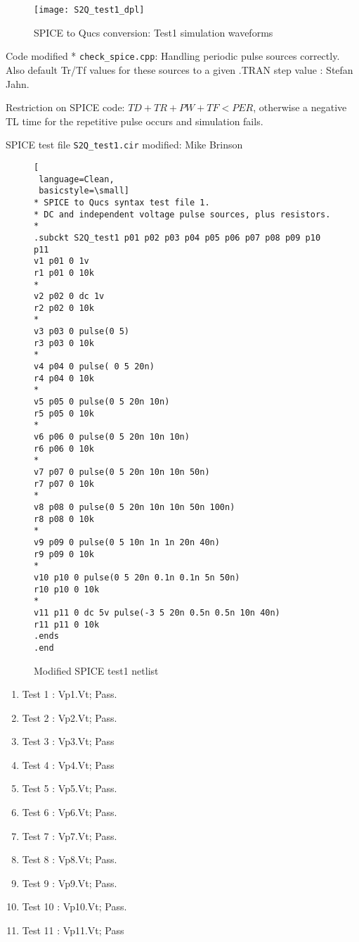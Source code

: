 \begin{figure}
  \centering
  \texttt{[image: S2Q\_test1\_dpl]}
  \caption{SPICE to Qucs conversion: Test1 simulation waveforms}
  \label{fig:S2Qtest1_3} 
\end{figure} 



Code modified   * \verb|check_spice.cpp|: Handling periodic pulse sources correctly. Also default Tr/Tf values for these sources to a given .TRAN step value : Stefan Jahn.

\vspace{5mm}
Restriction on SPICE code: $TD+TR+PW+TF < PER$, otherwise a negative TL time for the repetitive pulse occurs and simulation fails.

\vspace{5mm}
SPICE test file \verb|S2Q_test1.cir| modified: Mike Brinson
\vspace{5mm}
\begin{figure}
  \centering
\begin{lstlisting}[
 language=Clean, 
 basicstyle=\small]
* SPICE to Qucs syntax test file 1.
* DC and independent voltage pulse sources, plus resistors.
*
.subckt S2Q_test1 p01 p02 p03 p04 p05 p06 p07 p08 p09 p10 p11
v1 p01 0 1v
r1 p01 0 10k
*
v2 p02 0 dc 1v
r2 p02 0 10k
*
v3 p03 0 pulse(0 5)
r3 p03 0 10k
*
v4 p04 0 pulse( 0 5 20n)
r4 p04 0 10k
*
v5 p05 0 pulse(0 5 20n 10n)
r5 p05 0 10k
*
v6 p06 0 pulse(0 5 20n 10n 10n)
r6 p06 0 10k
*
v7 p07 0 pulse(0 5 20n 10n 10n 50n)
r7 p07 0 10k
*
v8 p08 0 pulse(0 5 20n 10n 10n 50n 100n)
r8 p08 0 10k
*
v9 p09 0 pulse(0 5 10n 1n 1n 20n 40n)
r9 p09 0 10k
*
v10 p10 0 pulse(0 5 20n 0.1n 0.1n 5n 50n)
r10 p10 0 10k
*
v11 p11 0 dc 5v pulse(-3 5 20n 0.5n 0.5n 10n 40n)
r11 p11 0 10k
.ends
.end
\end{lstlisting}
 \caption{Modified SPICE test1 netlist}
  \label{fig:S2Qtest1_4}
\end{figure} 


\begin{enumerate}
 \item Test 1  : Vp1.Vt;  Pass.
 \item Test 2  : Vp2.Vt;  Pass. 
 \item Test 3  : Vp3.Vt;  Pass
 \item Test 4  : Vp4.Vt;  Pass
 \item Test 5  : Vp5.Vt;  Pass.
 \item Test 6  : Vp6.Vt;  Pass.
 \item Test 7  : Vp7.Vt;  Pass.
 \item Test 8  : Vp8.Vt;  Pass.
 \item Test 9  : Vp9.Vt;  Pass.
 \item Test 10 : Vp10.Vt; Pass.
 \item \begin{flushleft}
Test 11 : Vp11.Vt; Pass \end{flushleft}
\end{enumerate}

